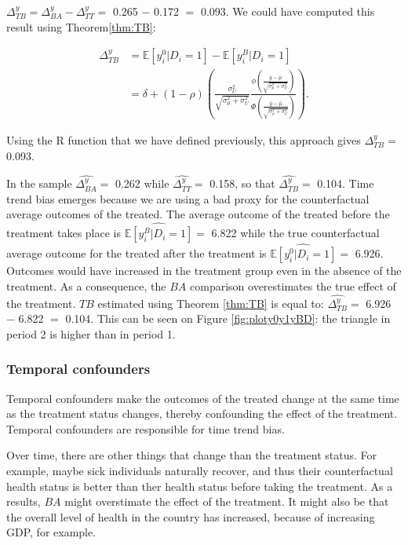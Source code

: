 \documentclass[]{book}
\newcommand{\esp}[1]{\mathbb{E}[ #1 ]}
\theoremstyle{definition}
\theoremstyle{definition}
\theoremstyle{definition}
\theoremstyle{remark}
\begin{document}
\(\Delta^y_{TB}=\Delta^y_{BA}-\Delta^y_{TT}=\) 0.265 \(-\) 0.172 \(=\) 0.093.
We could have computed this result using Theorem\ref{thm:TB}:

\begin{align*}
\Delta^y_{TB} & = \esp{y_i^0|D_i=1}-\esp{y_i^B|D_i=1} \\
              & = \delta + (1-\rho)\left(\frac{\sigma^2_{U}}{\sqrt{\sigma^2_{\mu}+\sigma^2_{U}}}\frac{\phi\left(\frac{\bar{y}-\bar{\mu}}{\sqrt{\sigma^2_{\mu}+\sigma^2_{U}}}\right)}{\Phi\left(\frac{\bar{y}-\bar{\mu}}{\sqrt{\sigma^2_{\mu}+\sigma^2_{U}}}\right)}\right).
\end{align*}

Using the R function that we have defined previously, this approach gives \(\Delta^y_{TB}=\) 0.093.

In the sample \(\hat{\Delta^y_{BA}}=\) 0.262 while \(\hat{\Delta^y_{TT}}=\) 0.158, so that \(\hat{\Delta^y_{TB}}=\) 0.104.
Time trend bias emerges because we are using a bad proxy for the counterfactual average outcomes of the treated.
The average outcome of the treated before the treatment takes place is \(\hat{\esp{y_i^B|D_i=1}}=\) 6.822 while the true counterfactual average outcome for the treated after the treatment is \(\hat{\esp{y_i^0|D_i=1}}=\) 6.926.
Outcomes would have increased in the treatment group even in the absence of the treatment.
As a consequence, the \(BA\) comparison overestimates the true effect of the treatment.
\(TB\) estimated using Theorem \ref{thm:TB} is equal to: \(\hat{\Delta^y_{TB}}=\) 6.926 \(-\) 6.822 \(=\) 0.104.
This can be seen on Figure \ref{fig:ploty0y1yBD}: the triangle in period 2 is higher than in period 1.

\hypertarget{temporal-confounders}{%
\subsubsection{Temporal confounders}\label{temporal-confounders}}

Temporal confounders make the outcomes of the treated change at the same time as the treatment status changes, thereby confounding the effect of the treatment.
Temporal confounders are responsible for time trend bias.

Over time, there are other things that change than the treatment status.
For example, maybe sick individuals naturally recover, and thus their counterfactual health status is better than ther health status before taking the treatment.
As a results, \(BA\) might overstimate the effect of the treatment.
It might also be that the overall level of health in the country has increased, because of increasing GDP, for example.
\end{document}
